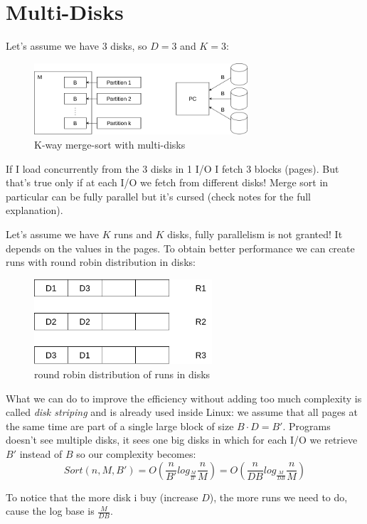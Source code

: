 \section{Multi-Disks}
Let's assume we have 3 disks, so $D=3$ and $K=3$:
\begin{figure}[H]
    \centering
    \includegraphics[width=300px]{images/2_Sorting/multi-disks.png}
    \caption{K-way merge-sort with multi-disks}
\end{figure}

If I load concurrently from the 3 disks in 1 I/O I fetch 3 blocks (pages). But that's true only if at each I/O we fetch from different disks!
Merge sort in particular can be fully parallel but it's cursed (check notes for the full explanation).

Let's assume we have $K$ runs and $K$ disks, fully parallelism is not granted! It depends on the values in the pages.
To obtain better performance we can create runs with round robin distribution in disks:
\begin{figure}[H]
    \centering
    \includegraphics[width=250px]{images/2_Sorting/multi-disks-round-robin.png}
    \caption{round robin distribution of runs in disks}
\end{figure}

What we can do to improve the efficiency without adding too much complexity is called \emph{disk striping} and is already used inside Linux: we assume that all pages at the same time are part of a single large block of size $B \cdot D = B'$.
Programs doesn't see multiple disks, it sees one big disks in which for each I/O we retrieve $B'$ instead of $B$ so our complexity becomes:
$$
    Sort(n, M, B') = O\left( \frac{n}{B'}log_{\frac{M}{B'}} \frac{n}{M} \right) = O \left( \frac{n}{DB}log_{\frac{M}{DB}} \frac{n}{M} \right)
$$

To notice that the more disk i buy (increase $D$), the more runs we need to do, cause the log base is $\frac{M}{DB}$.

